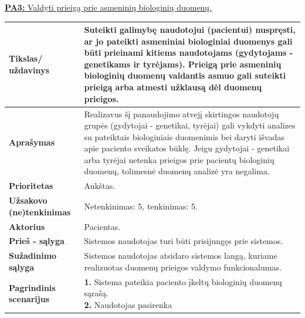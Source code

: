 \documentclass[12pt]{article}
\begin{document}
\newpage

\noindent \hypertarget{FR3}{\hyperlink{PA3}{\textbf{PA3:} Valdyti prieigą prie
asmeninių biologinių duomenų.}}
\label{sec:FR3}
\begin{table}[htb!]
    \captionsetup{justification=centering}
    \begin{tabular}{|m{3cm}|m{13.7cm}|}
        \hline
        \raggedleft \textbf{\cellcolor{deepchampagne}Tikslas/ uždavinys} &
        Suteikti galimybę naudotojui (pacientui) nuspręsti, ar jo pateikti
        asmeniniai biologiniai duomenys gali būti prieinami kitiems
        naudotojams (gydytojams - genetikams ir tyrėjams). Prieigą prie
        asmeninių biologinių duomenų valdantis asmuo gali suteikti prieigą arba
        atmesti užklausą dėl duomenų prieigos. \\
        \hline
        \raggedleft \textbf{\cellcolor{deepchampagne}Aprašymas} &
        Realizavus šį panaudojimo atvejį skirtingos naudotojų grupės
        (gydytojai - genetikai, tyrėjai) gali vykdyti analizes su pateiktais
        biologiniais duomenimis bei daryti išvadas apie paciento sveikatos
        būklę. Jeigu gydytojai - genetikai arba tyrėjai netenka prieigos
        prie pacientų biologinių duomenų, tolimesnė duomenų analizė yra
        negalima. \\
        \hline
        \raggedleft \textbf{\cellcolor{deepchampagne}Prioritetas} & Aukštas. \\
        \hline
        \raggedleft \textbf{\cellcolor{deepchampagne}Užsakovo (ne)tenkinimas} &
        Netenkinimas: 5, tenkinimas: 5. \\
        \hline
        \raggedleft \textbf{\cellcolor{deepchampagne}Aktorius} &
        Pacientas. \\
        \hline
        \raggedleft \textbf{\cellcolor{deepchampagne}Prieš - sąlyga} &
        Sistemos naudotojas turi būti prisijungęs prie sistemos. \\
        \hline
        \raggedleft \textbf{\cellcolor{deepchampagne}Sužadinimo sąlyga} &
        Sistemos naudotojas atsidaro sistemos langą, kuriame realizuotas duomenų
        prieigos valdymo funkcionalumas. \\
        \hline
        \raggedleft \textbf{\cellcolor{deepchampagne}Pagrindinis
        scenarijus} & \vskip 5pt
        \makecell[l]{\parbox[t]{13.7cm}{
            \textbf{1.} {Sistema pateikia paciento
            įkeltų biologinių duomenų sąrašą.} \\
            \textbf{2.} \textcolor{dartmouthgreen}{Naudotojas pasirenka
}}}
\end{tabular}
\end{table}
\end{document}
